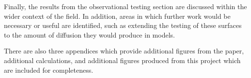 Finally, the results from the observational testing section are discussed within the wider context of the field. In addition, areas in which further work would be necessary or useful are identified, such as extending the testing of these surfaces to the amount of diffusion they would produce in models. 

There are also three appendices which provide additional figures from the \citet{McDougall1987} paper, additional calculations, and additional figures produced from this project which are included for completeness. 